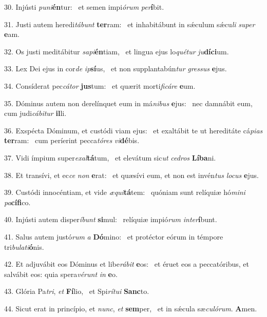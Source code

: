 30. Injústi \textit{pu}\textit{ni}\textbf{én}tur: \ast\  et semen impi\textit{ó}\textit{rum} \textit{per}\textbf{í}bit.\

31. Justi autem heredi\textit{tá}\textit{bunt} \textbf{ter}ram: \ast\  et inhabitábunt in sǽculum sǽcu\textit{li} \textit{su}\textit{per} \textbf{e}am.\

32. Os justi meditábitur \textit{sa}\textit{pi}\textbf{én}tiam, \ast\  et lingua ejus lo\textit{qué}\textit{tur} \textit{ju}\textbf{dí}\textbf{ci}um.\

33. Lex Dei ejus in cor\textit{de} \textit{ip}\textbf{sí}us, \ast\  et non supplantabún\textit{tur} \textit{gres}\textit{sus} \textbf{e}jus.\

34. Consíderat pec\textit{cá}\textit{tor} \textbf{jus}tum: \ast\  et quærit morti\textit{fi}\textit{cá}\textit{re} \textbf{e}um.\

35. Dóminus autem non derelínquet eum in má\textit{ni}\textit{bus} \textbf{e}jus: \ast\  nec damnábit eum, cum judi\textit{cá}\textit{bi}\textit{tur} \textbf{il}li.\

36. Exspécta Dóminum, et custódi viam ejus: \dag\  et exaltábit te ut hereditáte cá\textit{pi}\textit{as} \textbf{ter}ram: \ast\  cum períerint pecca\textit{tó}\textit{res} \textit{vi}\textbf{dé}bis.\

37. Vidi ímpium super\textit{ex}\textit{al}\textbf{tá}tum, \ast\  et elevátum sic\textit{ut} \textit{ce}\textit{dros} \textbf{Lí}\textbf{ba}ni.\

38. Et transívi, et ec\textit{ce} \textit{non} \textbf{e}rat: \ast\  et quæsívi eum, et non est invén\textit{tus} \textit{lo}\textit{cus} \textbf{e}jus.\

39. Custódi innocéntiam, et vide \textit{æ}\textit{qui}\textbf{tá}tem: \ast\  quóniam sunt relíquiæ hó\textit{mi}\textit{ni} \textit{pa}\textbf{cí}\textbf{fi}co.\

40. Injústi autem disper\textit{í}\textit{bunt} \textbf{si}mul: \ast\  relíquiæ impió\textit{rum} \textit{in}\textit{ter}\textbf{í}bunt.\

41. Salus autem justó\textit{rum} \textit{a} \textbf{Dó}mino: \ast\  et protéctor eórum in témpore tri\textit{bu}\textit{la}\textit{ti}\textbf{ó}nis.\

42. Et adjuvábit eos Dóminus et libe\textit{rá}\textit{bit} \textbf{e}os: \ast\  et éruet eos a peccatóribus, et salvábit eos: quia spera\textit{vé}\textit{runt} \textit{in} \textbf{e}o.\

43. Glória Pa\textit{tri}, \textit{et} \textbf{Fí}lio, \ast\  et Spi\textit{rí}\textit{tu}\textit{i} \textbf{Sanc}to.\

44. Sicut erat in princípio, et \textit{nunc}, \textit{et} \textbf{sem}per, \ast\  et in sǽcula sæ\textit{cu}\textit{ló}\textit{rum}. \textbf{A}men.\

